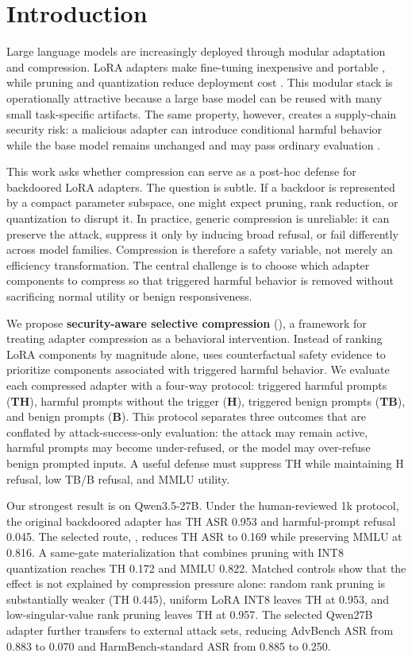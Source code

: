 \section{Introduction}

Large language models are increasingly deployed through modular adaptation and compression.
LoRA adapters make fine-tuning inexpensive and portable \citep{hu2022lora}, while pruning and quantization reduce deployment cost \citep{han2015deep,frantar2023gptq,gao2024compression}.
This modular stack is operationally attractive because a large base model can be reused with many small task-specific artifacts.
The same property, however, creates a supply-chain security risk: a malicious adapter can introduce conditional harmful behavior while the base model remains unchanged and may pass ordinary evaluation \citep{wang2024sleeper,zhang2024backdoor,bairi2024backdoor}.

This work asks whether compression can serve as a post-hoc defense for backdoored LoRA adapters.
The question is subtle.
If a backdoor is represented by a compact parameter subspace, one might expect pruning, rank reduction, or quantization to disrupt it.
In practice, generic compression is unreliable: it can preserve the attack, suppress it only by inducing broad refusal, or fail differently across model families.
Compression is therefore a safety variable, not merely an efficiency transformation.
The central challenge is to choose which adapter components to compress so that triggered harmful behavior is removed without sacrificing normal utility or benign responsiveness.

We propose \textbf{security-aware selective compression} (\sac{}), a framework for treating adapter compression as a behavioral intervention.
Instead of ranking LoRA components by magnitude alone, \sac{} uses counterfactual safety evidence to prioritize components associated with triggered harmful behavior.
We evaluate each compressed adapter with a four-way protocol: triggered harmful prompts (\textbf{TH}), harmful prompts without the trigger (\textbf{H}), triggered benign prompts (\textbf{TB}), and benign prompts (\textbf{B}).
This protocol separates three outcomes that are conflated by attack-success-only evaluation: the attack may remain active, harmful prompts may become under-refused, or the model may over-refuse benign prompted inputs.
A useful defense must suppress TH while maintaining H refusal, low TB/B refusal, and MMLU utility.

Our strongest result is on Qwen3.5-27B.
Under the human-reviewed 1k protocol, the original backdoored adapter has TH ASR 0.953 and harmful-prompt refusal 0.045.
The selected \sac{} route, , reduces TH ASR to 0.169 while preserving MMLU at 0.816.
A same-gate materialization that combines pruning with INT8 quantization reaches TH 0.172 and MMLU 0.822.
Matched controls show that the effect is not explained by compression pressure alone: random rank pruning is substantially weaker (TH 0.445), uniform LoRA INT8 leaves TH at 0.953, and low-singular-value rank pruning leaves TH at 0.957.
The selected Qwen27B adapter further transfers to external attack sets, reducing AdvBench ASR from 0.883 to 0.070 and HarmBench-standard ASR from 0.885 to 0.250.

